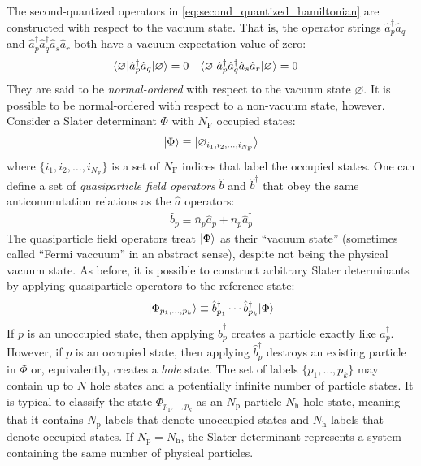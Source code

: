 The second-quantized operators in \eqref{eq:second_quantized_hamiltonian} are constructed with respect to the vacuum state.  That is, the operator strings $\hat{a}_p^\dagger \hat{a}_q$ and $\hat{a}_p^\dagger \hat{a}_q^\dagger \hat{a}_s \hat{a}_r$ both have a vacuum expectation value of zero:
\begin{align*}
&\langle \varnothing | \hat{a}_p^\dagger \hat{a}_q | \varnothing \rangle = 0 &
&\langle \varnothing | \hat{a}_p^\dagger \hat{a}_q^\dagger \hat{a}_s \hat{a}_r | \varnothing \rangle = 0
\end{align*}
They are said to be \emph{normal-ordered} with respect to the vacuum state $\varnothing$.  It is possible to be normal-ordered with respect to a non-vacuum state, however.  Consider a Slater determinant $\Phi$ with $N_{\mathrm{F}}$ occupied states:
\begin{align*}
  | \Phi \rangle \equiv | \varnothing_{i_1, i_2, \ldots, i_{N_{\mathrm{F}}}} \rangle
\end{align*}
where $\{i_1, i_2, \ldots, i_{N_{\mathrm{F}}}\}$ is a set of $N_{\mathrm{F}}$ indices that label the occupied states.  One can define a set of \textit{quasiparticle field operators} $\hat b$ and $\hat b^\dagger$ that obey the same anticommutation relations as the $\hat a$ operators:
\begin{align*}
  \hat b_p \equiv \bar n_p \hat a_{p} + n_p \hat a_{p}^\dagger
\end{align*}
The quasiparticle field operators treat $| \Phi \rangle$ as their ``vacuum state'' (sometimes called ``Fermi vaccuum'' in an abstract sense), despite not being the physical vacuum state.  As before, it is possible to construct arbitrary Slater determinants by applying quasiparticle operators to the reference state:
\begin{align}
  | \Phi_{p_1, \ldots, p_k} \rangle \equiv \hat{b}^\dagger_{p_1} \cdots \hat{b}^\dagger_{p_k} | \Phi \rangle
  \label{eq:quasisd}
\end{align}
If $p$ is an unoccupied state, then applying $\hat{b}_p^\dagger$ creates a particle exactly like $\hat{a}_p^\dagger$.  However, if $p$ is an occupied state, then applying $\hat{b}_p^\dagger$ destroys an existing particle in $\Phi$ or, equivalently, creates a \textit{hole} state.  The set of labels $\{p_1, \ldots, p_k\}$ may contain up to $N$ hole states and a potentially infinite number of particle states.  It is typical to classify the state $\Phi_{p_1, \ldots, p_k}$ as an $N_{\text{p}}$-particle-$N_{\text{h}}$-hole state, meaning that it contains $N_{\text{p}}$ labels that denote unoccupied states and $N_{\text{h}}$ labels that denote occupied states.  If $N_{\text{p}} = N_{\text{h}}$, the Slater determinant represents a system containing the same number of physical particles.

